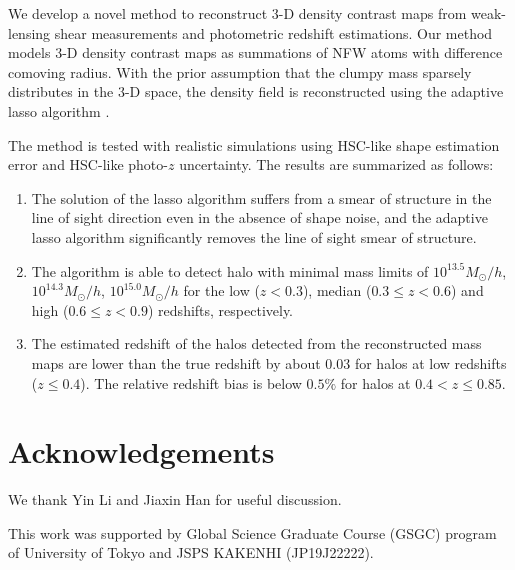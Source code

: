 \documentclass[twocolumn]{aastex62}
\begin{document}
We develop a novel method to reconstruct $3$-D density contrast maps from
weak-lensing shear measurements and photometric redshift estimations.  Our
method models $3$-D density contrast maps as summations of NFW atoms with
difference comoving radius.  With the prior assumption that the clumpy mass
sparsely distributes in the $3$-D space, the density field is reconstructed
using the adaptive lasso algorithm \citep{AdaLASSO-Zou2006}.

The method is tested with realistic simulations using HSC-like shape estimation
error and HSC-like photo-$z$ uncertainty. The results are summarized as follows:
\begin{enumerate}
 \item The solution of the lasso algorithm suffers from a smear of structure in
     the line of sight direction even in the absence of shape noise, and the
     adaptive lasso algorithm significantly removes the line of sight smear of
     structure.
 \item The algorithm is able to detect halo with minimal mass
     limits of $10^{13.5} M_{\odot}/h$, $10^{14.3} M_{\odot}/h$, $10^{15.0}
     M_{\odot}/h$ for the low ($z<0.3$), median ($0.3\leq z< 0.6$) and high
     ($0.6\leq z< 0.9$) redshifts, respectively.
 \item The estimated redshift
     of the halos detected from the reconstructed mass maps are lower than the
     true redshift by about $0.03$ for halos at low redshifts ($z\leq 0.4$).
     The relative redshift bias is below $0.5\%$ for halos at $0.4<z\leq 0.85$.
\end{enumerate}


\section*{Acknowledgements}
We thank Yin Li and Jiaxin Han for useful discussion.

This work was supported by Global Science Graduate Course (GSGC) program of
University of Tokyo and JSPS KAKENHI (JP19J22222).


\end{document}
